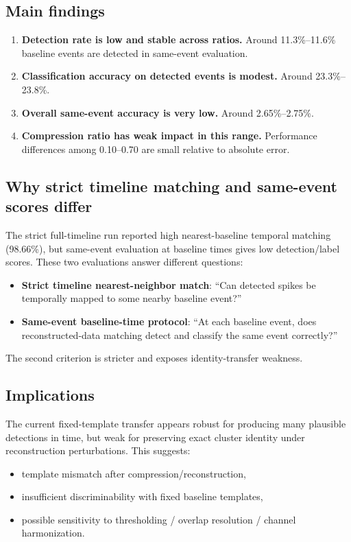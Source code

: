 ﻿\documentclass[11pt]{article}
\begin{document}
\subsection{Main findings}
\begin{enumerate}
  \item \textbf{Detection rate is low and stable across ratios.} Around 11.3\%--11.6\% baseline events are detected in same-event evaluation.
  \item \textbf{Classification accuracy on detected events is modest.} Around 23.3\%--23.8\%.
  \item \textbf{Overall same-event accuracy is very low.} Around 2.65\%--2.75\%.
  \item \textbf{Compression ratio has weak impact in this range.} Performance differences among 0.10--0.70 are small relative to absolute error.
\end{enumerate}

\subsection{Why strict timeline matching and same-event scores differ}
The strict full-timeline run reported high nearest-baseline temporal matching (98.66\%), but same-event evaluation at baseline times gives low detection/label scores. These two evaluations answer different questions:
\begin{itemize}
  \item \textbf{Strict timeline nearest-neighbor match}: ``Can detected spikes be temporally mapped to some nearby baseline event?''
  \item \textbf{Same-event baseline-time protocol}: ``At each baseline event, does reconstructed-data matching detect and classify the same event correctly?''
\end{itemize}
The second criterion is stricter and exposes identity-transfer weakness.

\subsection{Implications}
The current fixed-template transfer appears robust for producing many plausible detections in time, but weak for preserving exact cluster identity under reconstruction perturbations. This suggests:
\begin{itemize}
  \item template mismatch after compression/reconstruction,
  \item insufficient discriminability with fixed baseline templates,
  \item possible sensitivity to thresholding / overlap resolution / channel harmonization.
\end{itemize}
\end{document}
